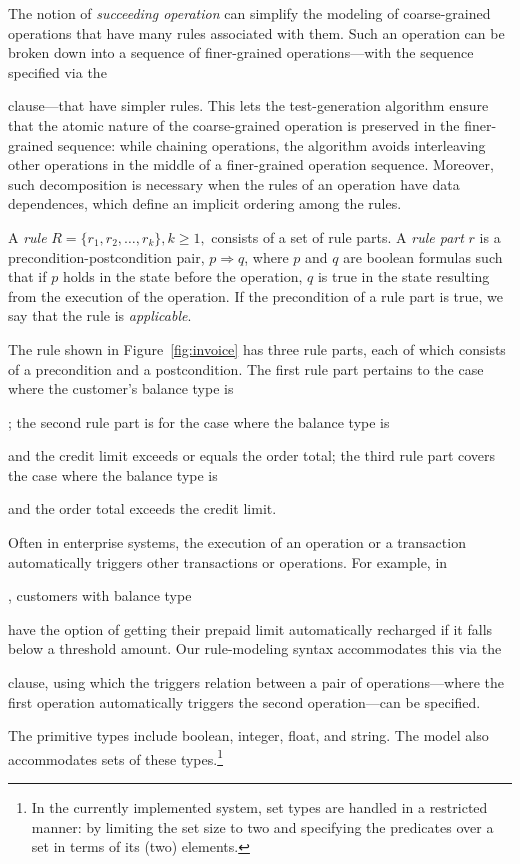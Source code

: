 The notion of \textit{succeeding operation} can simplify the modeling of
coarse-grained operations that have many rules associated with them. Such an
operation can be broken down into a sequence of finer-grained operations---with
the sequence specified via the \subject{next} clause---that have simpler
rules. This lets the test-generation algorithm ensure that the atomic nature of
the coarse-grained operation is preserved in the finer-grained sequence: while
chaining operations, the algorithm avoids interleaving other operations in the
middle of a finer-grained operation sequence.  Moreover, such decomposition is
necessary when the rules of an operation have data dependences, which define an
implicit ordering among the rules. %

A \textit{rule} $R = \{r_1, r_2, \ldots, r_k\}, k \geq 1,$ consists of a set of
rule parts. A \textit{rule part} $r$ is a precondition-postcondition pair, $p
\Longrightarrow q$, where $p$ and $q$ are boolean formulas such that if $p$
holds in the state before the operation, $q$ is true in the state resulting from
the execution of the operation. If the precondition of a rule part is true, we
say that the rule is \textit{applicable}.

The rule shown in Figure~\ref{fig:invoice} has three rule parts, each of which
consists of a precondition and a postcondition. The first rule part pertains to
the case where the customer's balance type is \subject{None}; the second rule
part is for the case where the balance type is \subject{Credit} and the credit
limit exceeds or equals the order total; the third rule part covers the case
where the balance type is \subject{Credit} and the order total exceeds the
credit limit.

Often in enterprise systems, the execution of an operation or a transaction
automatically triggers other transactions or operations. For example, in
\subject{jBilling}, customers with balance type \subject{Prepaid} have the
option of getting their prepaid limit automatically recharged if it falls below
a threshold amount. Our rule-modeling syntax accommodates this via the
\subject{Triggers} clause, using which the triggers relation between a pair of
operations---where the first operation automatically triggers the second
operation---can be specified.

The primitive types include boolean, integer, float, and string. The model also
accommodates sets of these types.\footnote{In the currently implemented system,
  set types are handled in a restricted manner: by limiting the set size to two
  and specifying the predicates over a set in terms of its (two) elements.}

